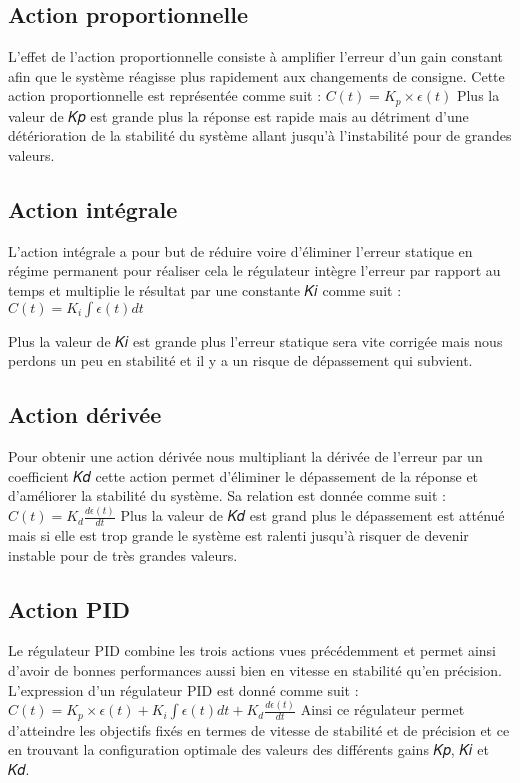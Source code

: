 \documentclass[a4paper,12pt]{report}
\begin{document}
\subsection {Action proportionnelle}
L’effet de l’action proportionnelle consiste à amplifier l’erreur d’un gain constant afin que le
système réagisse plus rapidement aux changements de consigne. Cette action proportionnelle est
représentée comme suit :
$ 𝐶(𝑡) = 𝐾_𝑝  \times \epsilon(t)$
Plus la valeur de 𝐾𝑝 est grande plus la réponse est rapide mais au détriment d’une détérioration
de la stabilité du système allant jusqu’à l’instabilité pour de grandes valeurs.




\subsection  {Action intégrale}
L’action intégrale a pour but de réduire voire d’éliminer l’erreur statique en régime permanent
pour réaliser cela le régulateur intègre l’erreur par rapport au temps et multiplie le résultat par une
constante 𝐾𝑖 comme suit :
$ 𝐶(𝑡) = K_i\int\epsilon(t)dt$

Plus la valeur de 𝐾𝑖 est grande plus l’erreur statique sera vite corrigée mais nous perdons un peu
en stabilité et il y a un risque de dépassement qui subvient.

\subsection  {Action dérivée}
Pour obtenir une action dérivée nous multipliant la dérivée de l’erreur par un coefficient 𝐾𝑑
cette action permet d’éliminer le dépassement de la réponse et d’améliorer la stabilité du système. Sa
relation est donnée comme suit :
$ 𝐶(𝑡) = K_d \frac{d\epsilon(t)}{dt}$
Plus la valeur de 𝐾𝑑 est grand plus le dépassement est atténué mais si elle est trop grande le
système est ralenti jusqu’à risquer de devenir instable pour de très grandes valeurs.




\subsection {Action PID} 
Le régulateur PID combine les trois actions vues précédemment et permet ainsi d’avoir de
bonnes performances aussi bien en vitesse en stabilité qu’en précision. L’expression d’un régulateur
PID est donné comme suit :
$ 𝐶(𝑡) = 𝐾_𝑝  \times \epsilon(t) + K_i\int\epsilon(t)dt + K_d \frac{d\epsilon(t)}{dt} $
Ainsi ce régulateur permet d’atteindre les objectifs fixés en termes de vitesse de stabilité et de
précision et ce en trouvant la configuration optimale des valeurs des différents gains 𝐾𝑝, 𝐾𝑖 et 𝐾𝑑.	
\end{document}
